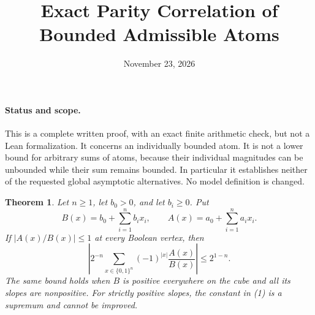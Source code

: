 \documentclass[11pt]{article}
\title{Exact Parity Correlation of Bounded Admissible Atoms}
\author{}
\date{November 23, 2026}
\newtheorem{theorem}{Theorem}
\begin{document}
\maketitle

\paragraph{Status and scope.}
This is a complete written proof, with an exact finite arithmetic check,
but not a Lean formalization. It concerns an individually bounded atom.
It is not a lower bound for arbitrary sums of atoms, because their
individual magnitudes can be unbounded while their sum remains bounded.
In particular it establishes neither of the requested global asymptotic
alternatives. No model definition is changed.

\begin{theorem}
Let $n\geq1$, let $b_0>0$, and let $b_i\geq0$. Put
\[
 B(x)=b_0+\sum_{i=1}^n b_ix_i,\qquad
 A(x)=a_0+\sum_{i=1}^n a_ix_i.
\]
If $|A(x)/B(x)|\leq1$ at every Boolean vertex, then
\[
 \left|2^{-n}\sum_{x\in\{0,1\}^n}
              (-1)^{|x|}\frac{A(x)}{B(x)}\right|\leq 2^{1-n}.
 \tag{1}
\]
The same bound holds when $B$ is positive everywhere on the cube and
all its slopes are nonpositive. For strictly positive slopes, the
constant in (1) is a supremum and cannot be improved.
\end{theorem}
\end{document}
